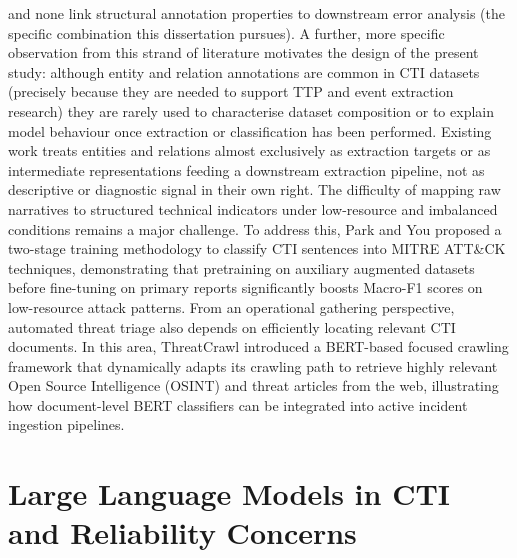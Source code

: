 \documentclass[12pt,a4paper]{report}
\begin{document}
and none link structural annotation properties to downstream error
analysis (the specific combination this dissertation pursues). A
further, more specific observation from this strand of literature
motivates the design of the present study: although entity and relation
annotations are common in CTI datasets (precisely because they are
needed to support TTP and event extraction research) they are rarely
used to characterise dataset composition or to explain model behaviour
once extraction or classification has been performed. Existing work
treats entities and relations almost exclusively as extraction targets
or as intermediate representations feeding a downstream extraction
pipeline, not as descriptive or diagnostic signal in their own right.
The difficulty of mapping raw narratives to structured technical
indicators under low-resource and imbalanced conditions remains a major
challenge. To address this, Park and You
\cite{park2024twostage}
proposed a two-stage training methodology to classify CTI sentences into
MITRE ATT\&CK techniques, demonstrating that pretraining on auxiliary
augmented datasets before fine-tuning on primary reports significantly
boosts Macro-F1 scores on low-resource attack patterns. From an
operational gathering perspective, automated threat triage also depends
on efficiently locating relevant CTI documents. In this area,
ThreatCrawl
\cite{threatcrawl2023}
introduced a BERT-based focused crawling framework that dynamically
adapts its crawling path to retrieve highly relevant Open Source
Intelligence (OSINT) and threat articles from the web, illustrating how
document-level BERT classifiers can be integrated into active incident
ingestion pipelines.
\section{Large Language Models in CTI and Reliability
Concerns}\label{large-language-models-in-cti-and-reliability-concerns}
\end{document}
